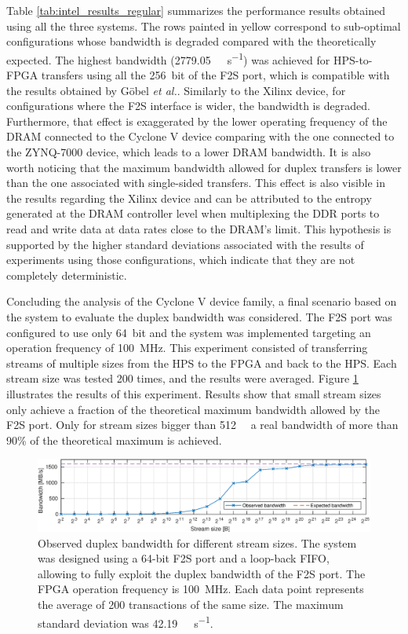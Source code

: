 Table \ref{tab:intel_results_regular} summarizes the performance results obtained using all the three systems. The rows painted in yellow correspond to sub-optimal configurations whose bandwidth is degraded compared with the theoretically expected. The highest bandwidth (\SI{2779.05}{\mega\byte\per\second}) was achieved for \ac{HPS}-to-\ac{FPGA} transfers using all the \SI{256}{bit} of the \ac{F2S} port, which is compatible with the results obtained by G{\"{o}}bel \textit{et al.}. Similarly to the Xilinx device, for configurations where the \ac{F2S} interface is wider, the bandwidth is degraded. Furthermore, that effect is exaggerated by the lower operating frequency of the DRAM connected to the Cyclone V device comparing with the one connected to the ZYNQ-7000 device, which leads to a lower DRAM bandwidth. It is also worth noticing that the maximum bandwidth allowed for duplex transfers is lower than the one associated with single-sided transfers. This effect is also visible in the results regarding the Xilinx device and can be attributed to the entropy generated at the DRAM controller level when multiplexing the DDR ports to read and write data at data rates close to the DRAM's limit. This hypothesis is supported by the higher standard deviations associated with the results of experiments using those configurations, which indicate that they are not completely deterministic.


Concluding the analysis of the Cyclone V device family, a final scenario based on the system to evaluate the duplex bandwidth was considered. The \ac{F2S} port was configured to use only \SI{64}{bit} and the system was implemented targeting an operation frequency of \SI{100}{\mega\hertz}. This experiment consisted of transferring streams of multiple sizes from the \ac{HPS} to the \ac{FPGA} and back to the \ac{HPS}. Each stream size was tested 200 times, and the results were averaged. Figure \ref{fig:intel_results_var_size} illustrates the results of this experiment. Results show that small stream sizes only achieve a fraction of the theoretical maximum bandwidth allowed by the \ac{F2S} port. Only for stream sizes bigger than \SI{512}{\kibi\byte} a real bandwidth of more than 90\% of the theoretical maximum is achieved.

\begin{figure}[t]
    \centering
    \includegraphics[width=\linewidth]{figures/intel_var_stream_size.eps}
    \caption{Observed duplex bandwidth for different stream sizes. The system was designed using a 64-bit \ac{F2S} port and a loop-back \ac{FIFO}, allowing to fully exploit the duplex bandwidth of the \ac{F2S} port. The \ac{FPGA} operation frequency is \SI{100}{\mega\hertz}. Each data point represents the average of 200 transactions of the same size. The maximum standard deviation was \SI{42.19}{\mega\byte\per\second}.}
    \label{fig:intel_results_var_size}
\end{figure}